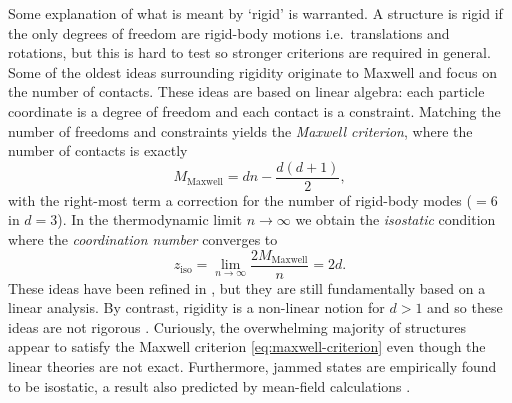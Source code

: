 \documentclass[11pt,twoside]{report}
\begin{document}
Some explanation of what is meant by `rigid' is warranted.
A structure is rigid if the only degrees of freedom are rigid-body motions i.e.\ translations and rotations, but this is hard to test so stronger criterions are required in general.
Some of the oldest ideas surrounding rigidity originate to Maxwell \cite{MaxwellRigidity1864} and focus on the number of contacts.
These ideas are based on linear algebra: each particle coordinate is a degree of freedom and each contact is a constraint.
Matching the number of freedoms and constraints yields the \emph{Maxwell criterion}, where the number of contacts is exactly \cite{MaxwellRigidity1864}
\begin{equation}\label{eq:maxwell-criterion}
  M_\mathrm{Maxwell} = dn - \frac{d(d+1)}{2},
\end{equation}
with the right-most term a correction for the number of rigid-body modes ($=6$ in $d=3$).
In the thermodynamic limit $n \to \infty$ we obtain the \emph{isostatic} condition where the \emph{coordination number} converges to
\begin{equation*}
  z_\mathrm{iso}
  =
  \lim_{n \to \infty} \frac{2M_\mathrm{Maxwell}}{n}
  = 2d.
\end{equation*}
These ideas have been refined in \cite{CalladineIJSS1978}, but they are still fundamentally based on a linear analysis.
By contrast, rigidity is a non-linear notion for $d > 1$ and so these ideas are not rigorous%
.
Curiously, the overwhelming majority of structures appear to satisfy the Maxwell criterion \eqref{eq:maxwell-criterion} \cite{Holmes-CerfonSR2016,Holmes-CerfonARCMP2017} even though the linear theories are not exact.
Furthermore, jammed states are empirically found to be isostatic, a result also predicted by mean-field calculations \cite{CharbonneauJSM2014,CharbonneauNC2014}.
\end{document}
